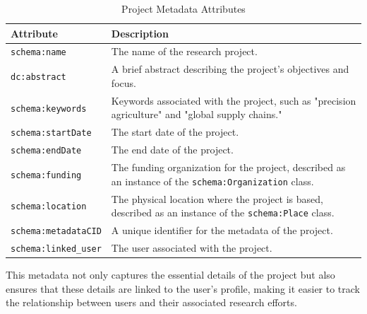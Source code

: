 \documentclass{article}
\begin{document}
\begin{table}[h]
      \centering
      \begin{tabular}{|l|l|}
            \hline
            \textbf{Attribute}           & \textbf{Description}                                                                                           \\ \hline
            \texttt{schema:name}         & The name of the research project.                                                                              \\ \hline
            \texttt{dc:abstract}         & A brief abstract describing the project's objectives and focus.                                                \\ \hline
            \texttt{schema:keywords}     & Keywords associated with the project, such as "precision agriculture" and "global supply chains."              \\ \hline
            \texttt{schema:startDate}    & The start date of the project.                                                                                 \\ \hline
            \texttt{schema:endDate}      & The end date of the project.                                                                                   \\ \hline
            \texttt{schema:funding}      & The funding organization for the project, described as an instance of the \texttt{schema:Organization} class.  \\ \hline
            \texttt{schema:location}     & The physical location where the project is based, described as an instance of the \texttt{schema:Place} class. \\ \hline
            \texttt{schema:metadataCID}  & A unique identifier for the metadata of the project.                                                           \\ \hline
            \texttt{schema:linked\_user} & The user associated with the project.                                                                          \\ \hline
      \end{tabular}
      \caption{Project Metadata Attributes}
\end{table}

This metadata not only captures the essential details of the project but also ensures that these details are linked to the user's profile, making it easier to track the relationship between users and their associated research efforts.
\end{document}
